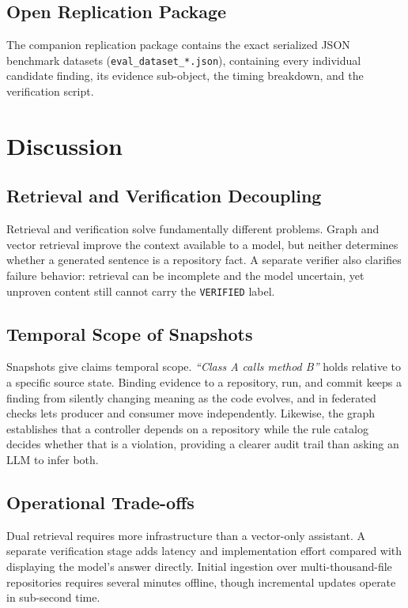 \documentclass[runningheads]{llncs}
\begin{document}
\subsection{Open Replication Package}
The companion replication package contains the exact serialized JSON benchmark datasets (\texttt{eval\_dataset\_*.json}), containing every individual candidate finding, its evidence sub-object, the timing breakdown, and the verification script.

\section{Discussion}

\subsection{Retrieval and Verification Decoupling}
Retrieval and verification solve fundamentally different problems. Graph and vector retrieval improve the context available to a model, but neither determines whether a generated sentence is a repository fact. A separate verifier also clarifies failure behavior: retrieval can be incomplete and the model uncertain, yet unproven content still cannot carry the \texttt{VERIFIED} label.

\subsection{Temporal Scope of Snapshots}
Snapshots give claims temporal scope. \textit{``Class A calls method B''} holds relative to a specific source state. Binding evidence to a repository, run, and commit keeps a finding from silently changing meaning as the code evolves, and in federated checks lets producer and consumer move independently. Likewise, the graph establishes that a controller depends on a repository while the rule catalog decides whether that is a violation, providing a clearer audit trail than asking an LLM to infer both.

\subsection{Operational Trade-offs}
Dual retrieval requires more infrastructure than a vector-only assistant. A separate verification stage adds latency and implementation effort compared with displaying the model's answer directly. Initial ingestion over multi-thousand-file repositories requires several minutes offline, though incremental updates operate in sub-second time.
\end{document}
